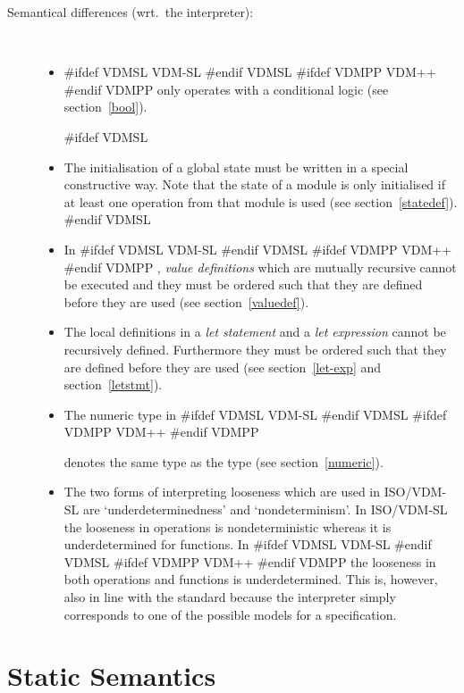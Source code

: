 \documentclass[\pformat,12pt]{article}
\newcommand{\vdmslpp}[2]{%
#ifdef VDMSL
#1
#endif VDMSL
#ifdef VDMPP
#2
#endif VDMPP
}
\newcommand{\vdmsl}{VDM-SL}
\newcommand{\vdmpp}{VDM++}
\begin{document}
\begin{description}
\begin{itemize}
  \end{itemize}
  
\item[Semantical differences (wrt.\ the interpreter):]\mbox{}\\[-3mm] 
  \begin{itemize}
  
  \item  \vdmslpp{\vdmsl}{\vdmpp} only operates with a
    conditional logic (see section~\ref{bool}).
    
#ifdef VDMSL
  \item The initialisation of a global state must be written in a
    special constructive way. Note that the state of a module is only
    initialised if at least one operation from that module is used
    (see section~\ref{statedef}).
#endif VDMSL

  \item In  \vdmslpp{\vdmsl}{\vdmpp}, {\it value definitions\/}
    which are mutually recursive cannot be executed and they must be
    ordered such that they are defined before they are used (see
    section~\ref{valuedef}).
    
  \item The local definitions in a {\it let statement\/} and a {\it
    let expression\/} cannot be recursively defined. Furthermore they
    must be ordered such that they are defined before they are used
    (see section~\ref{let-exp} and section~\ref{letstmt}).
    
  \item The numeric type  in  \vdmslpp{\vdmsl}{\vdmpp}
    denotes the same type as the type  (see
    section~\ref{numeric}).
      
  \item The two forms of interpreting looseness which are used in
    ISO/VDM-SL are `underdeterminedness' and `nondeterminism'. In
    ISO/VDM-SL the looseness in operations is nondeterministic whereas
    it is underdetermined for functions. In 
    \vdmslpp{\vdmsl}{\vdmpp} the looseness in both operations and
    functions is underdetermined. This is, however, also in line with
    the standard because the interpreter simply corresponds to one of
    the possible models for a specification.

  \end{itemize}
\end{description}

\section{Static Semantics}\label{static}
\end{document}
